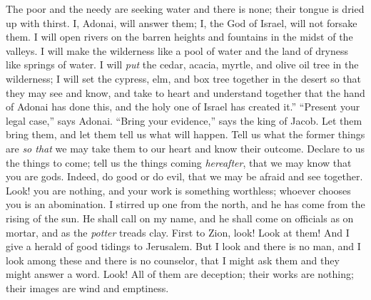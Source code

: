\begin{biblechapter}
\verse The poor and the needy are seeking water and there is none; 
their tongue is dried up with thirst. 
I, Adonai, will answer them; 
I, the God of Israel, will not forsake them.
\verse I will open rivers on the barren heights 
and fountains in the midst of the valleys. 
I will make the wilderness like a pool of water 
and the land of dryness like springs of water.
\verse I will \textit{put} the cedar, acacia, myrtle, and olive oil tree in the wilderness; 
I will set the cypress, elm, and box tree together in the desert
\verse so that they may see and know, 
and take to heart and understand together 
that the hand of Adonai has done this, 
and the holy one of Israel has created it.”
\verse “Present your legal case,” says Adonai. 
“Bring your evidence,” says the king of Jacob.
\verse Let them bring them, 
and let them tell us what will happen. 
Tell us what the former things are 
\textit{so that} we may take them to our heart 
and know their outcome. 
Declare to us the things to come;
\verse tell us the things coming \textit{hereafter}, 
that we may know that you are gods. 
Indeed, do good or do evil, 
that we may be afraid and see together.
\verse Look! you are nothing, 
and your work is something worthless; 
whoever chooses you is an abomination.
\verse I stirred up one from the north, 
and he has come from the rising of the sun. He shall call on my name,
\verse and he shall come on officials as on mortar, 
and as the \textit{potter} treads clay.
\verse First to Zion, look! Look at them! And I give a herald of good tidings to Jerusalem.
\verse But I look and there is no man, 
and I look among these and there is no counselor, 
that I might ask them and they might answer a word.
\verse Look! All of them are deception; 
their works are nothing; 
their images are wind and emptiness.
\end{biblechapter}

